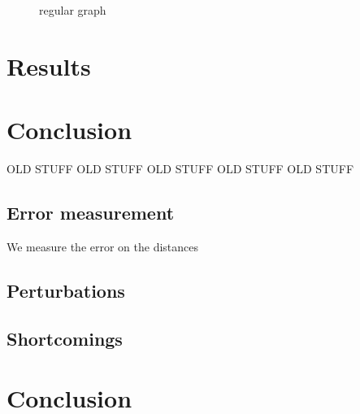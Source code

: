\documentclass[letterpaper, 10 pt, conference]{ieeeconf}  %
\begin{document}
\begin{figure}[ht!]
\centering
\caption{regular graph}
\end{figure}


\section{Results}

\section{Conclusion}










OLD STUFF
OLD STUFF
OLD STUFF
OLD STUFF
OLD STUFF














\subsection{Error measurement}
We measure the error on the distances 




\subsection{Perturbations}

\subsection{Shortcomings}
%

\section{Conclusion}
\end{document}
